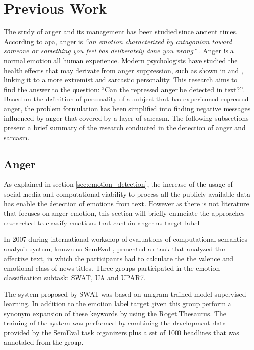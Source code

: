 
\section{Previous Work}
\label{sec:previous_work}

The study of anger and its management has been studied since ancient times. According to \acrfull{apa}, anger is \textit{``an emotion characterized by antagonism toward someone or something you feel has deliberately done you wrong''} \cite{angerAPA}. Anger is a normal emotion all human experience. Modern psychologists have studied the health effects that may derivate from anger suppression, such as shown in \cite{kemp1995anger} and \cite{staicu2010anger}, linking it to a more extremist and sarcastic personality. This research aims to find the answer to the question: ``Can the repressed anger be detected in text?''. Based on the definition of personality of a subject that has experienced repressed anger, the problem formulation has been simplified into finding negative messages influenced by anger that covered by a layer of sarcasm. The following subsections present a brief summary of the research conducted in the detection of anger and sarcasm.

\subsection{Anger}
\label{subsec:anger}

As explained in section \ref{sec:emotion_detection}, the increase of the usage of social media and computational viability to process all the publicly available data has enable the detection of emotions from text. However as there is not literature that focuses on anger emotion, this section will briefly enunciate the approaches researched to classify emotions that contain anger as target label.

In 2007 during international workshop of evaluations of computational semantics analysis system, known as SemEval \cite{SemEvalPortal}, presented an task that analyzed the affective text, in which the participants had to calculate the the valence and emotional class of news titles. Three groups participated in the emotion classification subtask: SWAT, UA and UPAR7. 

The system proposed by SWAT was based on unigram trained model supervised learning. In addition to the emotion label target given this group perform a synonym expansion of these keywords by using the Roget Thesaurus. The training of the system was performed by combining the development data provided by the SemEval task organizers plus a set of 1000 headlines that was annotated from the group.

